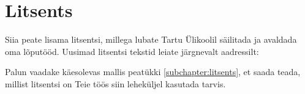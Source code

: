 \section*{Litsents} \label{litsents} 
Siia peate lisama litsentsi, millega lubate Tartu Ülikoolil säilitada ja avaldada oma lõputööd. Uusimad litsentsi tekstid leiate järgnevalt aadressilt:


Palun vaadake käesolevas mallis peatükki \ref{subchapter:litsents}, et saada teada, millist litsentsi on Teie töös siin leheküljel kasutada tarvis.